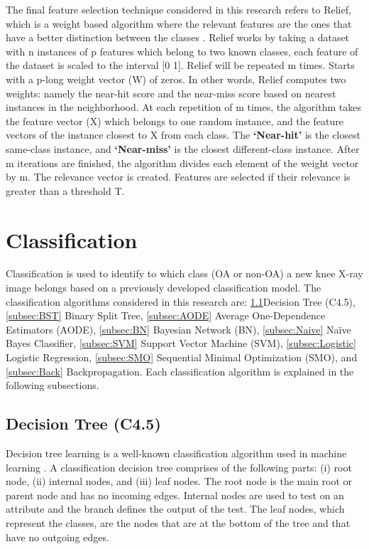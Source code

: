 \documentclass[review]{elsarticle}
\begin{document}
The final feature selection technique considered in this research refers to Relief, which is a weight based algorithm where the relevant features are the ones that have a better distinction between the classes \cite{Kira1994}. Relief works by taking a dataset with n instances of p features which belong to two known classes, each feature of the dataset is scaled to the interval [0 1]. Relief will be repeated m times. Starts with a p-long weight vector (W) of zeros. In other words, Relief computes two weights: namely the near-hit score and the near-miss score based on nearest instances in the neighborhood.
At each repetition of m times, the algorithm takes the feature vector (X) which belongs to one random instance, and the feature vectors of the instance closest to X from each class. The \textbf{\lq Near-hit\rq} is the closest same-class instance, and \textbf{\lq Near-miss\rq} is the closest different-class instance. After m iterations are finished, the algorithm divides each element of the weight vector by m. The relevance vector is created. Features are selected if their relevance is greater than a threshold T.

 
\section{Classification}

Classification is used to identify to which class (OA or non-OA) a new knee X-ray image belongs based on a previously developed classification model. The classification algorithms considered in this research are: \ref{subsec:DT}Decision Tree (C4.5), \ref{subsec:BST} Binary Split Tree, \ref{subsec:AODE} Average One-Dependence Estimators (AODE), \ref{subsec:BN} Bayesian Network (BN), \ref{subsec:Naive} Na\"ive Bayes Classifier, \ref{subsec:SVM} Support Vector Machine (SVM), \ref{subsec:Logistic} Logistic Regression, \ref{subsec:SMO} Sequential Minimal Optimization (SMO), and \ref{subsec:Back} Backpropagation. Each classification algorithm is explained in the following subsections.

\subsection{Decision Tree (C4.5)}
\label{subsec:DT}
Decision tree learning is a well-known classification algorithm used in machine learning \cite{Quinlan1986}. A classification decision tree comprises of the following parts: (i) root node, (ii) internal nodes, and (iii) leaf nodes. The root node is the main root or parent node and has no incoming edges. Internal nodes are used to test on an attribute and the branch defines the output of the test. The leaf nodes, which represent the classes, are the nodes that are at the bottom of the tree and that have no outgoing edges.
\end{document}
